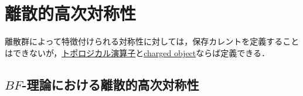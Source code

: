 \documentclass[TQFT_main]{subfiles}
\begin{document}

    

    






\section{離散的高次対称性}

離散群によって特徴付けられる対称性に対しては，保存カレントを定義することはできないが，\hyperref[def:p-form-sym]{トポロジカル演算子}と\hyperref[def:p-form-sym]{charged object}ならば定義できる．

\subsection{$BF$-理論における離散的高次対称性}
\end{document}
